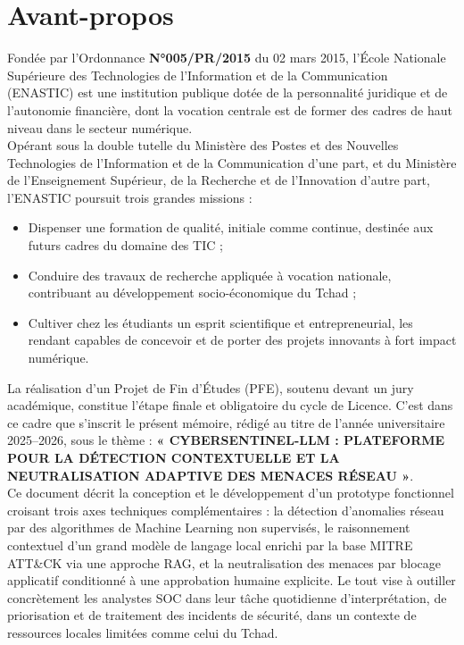 \documentclass[12pt,a4paper]{report}
\begin{document}
\chapter*{Avant-propos}
\begin{onehalfspace}
Fondée par l'Ordonnance \textbf{N°005/PR/2015} du 02 mars 2015, l'École
Nationale Supérieure des Technologies de l'Information et de la Communication
(ENASTIC) est une institution publique dotée de la personnalité juridique et
de l'autonomie financière, dont la vocation centrale est de former des cadres
de haut niveau dans le secteur numérique.\\

Opérant sous la double tutelle du Ministère des Postes et des Nouvelles
Technologies de l'Information et de la Communication d'une part, et du
Ministère de l'Enseignement Supérieur, de la Recherche et de l'Innovation
d'autre part, l'ENASTIC poursuit trois grandes missions :

\begin{itemize}
  \item[\ding{43}] Dispenser une formation de qualité, initiale comme
  continue, destinée aux futurs cadres du domaine des TIC ;
  \item[\ding{43}] Conduire des travaux de recherche appliquée à vocation
  nationale, contribuant au développement socio-économique du Tchad ;
  \item[\ding{43}] Cultiver chez les étudiants un esprit scientifique et
  entrepreneurial, les rendant capables de concevoir et de porter des projets
  innovants à fort impact numérique.
\end{itemize}

La réalisation d'un Projet de Fin d'Études (PFE), soutenu devant un jury
académique, constitue l'étape finale et obligatoire du cycle de Licence.
C'est dans ce cadre que s'inscrit le présent mémoire, rédigé au titre de
l'année universitaire 2025--2026, sous le thème :
\textbf{« CYBERSENTINEL-LLM : PLATEFORME POUR LA DÉTECTION CONTEXTUELLE ET LA NEUTRALISATION
ADAPTIVE DES MENACES RÉSEAU »}.\\

Ce document décrit la conception et le développement d'un prototype
fonctionnel croisant trois axes techniques complémentaires : la détection
d'anomalies réseau par des algorithmes de Machine Learning non supervisés,
le raisonnement contextuel d'un grand modèle de langage local enrichi par
la base MITRE ATT\&CK via une approche RAG, et la neutralisation des menaces
par blocage applicatif conditionné à une approbation humaine explicite. Le
tout vise à outiller concrètement les analystes SOC dans leur tâche quotidienne
d'interprétation, de priorisation et de traitement des incidents de sécurité,
dans un contexte de ressources locales limitées comme celui du Tchad.
\end{onehalfspace}
\newpage
\end{document}
